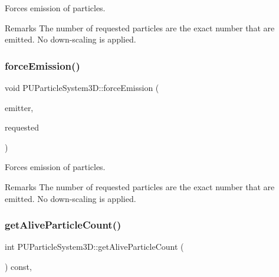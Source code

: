 Forces emission of particles. \begin{DoxyRemark}{Remarks}
The number of requested particles are the exact number that are emitted. No down-\/scaling is applied. 
\end{DoxyRemark}
\mbox{\label{classPUParticleSystem3D_abc2757bc7cd26511bdce5d0dd85f0d8a}} 
\subsubsection{\texorpdfstring{force\+Emission()}{forceEmission()}\hspace{0.1cm}{\footnotesize\ttfamily [2/2]}}
{\footnotesize\ttfamily void P\+U\+Particle\+System3\+D\+::force\+Emission (\begin{DoxyParamCaption}\item[{\hyperlink{classPUEmitter}{P\+U\+Emitter} $\ast$}]{emitter,  }\item[{unsigned}]{requested }\end{DoxyParamCaption})}

Forces emission of particles. \begin{DoxyRemark}{Remarks}
The number of requested particles are the exact number that are emitted. No down-\/scaling is applied. 
\end{DoxyRemark}
\mbox{\label{classPUParticleSystem3D_a23b835c5c50aba7764c928b9edcb899c}} 
\subsubsection{\texorpdfstring{get\+Alive\+Particle\+Count()}{getAliveParticleCount()}\hspace{0.1cm}{\footnotesize\ttfamily [1/2]}}
{\footnotesize\ttfamily int P\+U\+Particle\+System3\+D\+::get\+Alive\+Particle\+Count (\begin{DoxyParamCaption}{ }\end{DoxyParamCaption}) const\hspace{0.3cm}{\ttfamily [override]}, {\ttfamily [virtual]}}

